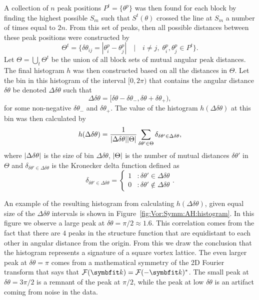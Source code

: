 A collection of $n$ peak positions $P^t = \{\theta^p\}$ was then found for each block by finding the highest possible $S_m$ such that $S^t(\theta)$ crossed the line at $S_m$ a number of times equal to $2n$. From this set of peaks,
then all possible distances between these peak positions were constructed by
\begin{equation}
    \label{eq:Vor:Symm:AH:mutualDistances}
    \Theta^t = \{\delta\theta_{ij} = |\theta^p_i-\theta^p_j|\quad|\quad i\neq j,\;\theta_i^p,\theta_j^p\in P^t\}.
\end{equation}
Let $\Theta = \bigcup_t\Theta^t$ be the union of all block sets of mutual angular peak distances. The final histogram $h$ was then constructed based on all the distances in $\Theta$. Let the bin
in this histogram of the interval $[0,2\pi)$ that contains the angular distance $\delta\theta$ be denoted $\Delta\delta\theta$ such that 
\begin{equation}
    \label{eq:Vor:Symm:AH:mutualDistancesBin}
    \Delta\delta\theta = [\delta\theta-\delta\theta_-,\delta\theta+\delta\theta_+),
\end{equation}
for some non-negative $\delta\theta_-$ and $\delta\theta_+$. The value of the histogram $h(\Delta\delta\theta)$ at this bin was then calculated by
\begin{equation}
    \label{eq:Vor:Symm:AH:histogramDef}
    h(\Delta\delta\theta) = \frac{1}{\lvert \Delta\delta\theta \rvert\lvert \Theta \rvert}\sum_{\delta\theta'\in\Theta}\delta_{\delta\theta'\in\Delta\delta\theta},
\end{equation}
where $\lvert \Delta\delta\theta \rvert$ is the size of bin $\Delta\delta\theta$, $\lvert \Theta \rvert$ is the number of mutual distances $\delta\theta'$ in $\Theta$
and $\delta_{\delta\theta'\in\Delta\delta\theta}$ is the Kronecker delta function defined as
\begin{equation}
    \label{eq:Vor:Symm:AH:kroneckerDelta}
    \delta_{\delta\theta'\in\Delta\delta\theta} = \left\{
    \begin{array}{lr}
        1 & : \delta\theta'\in\Delta\delta\theta \\
        0 & : \delta\theta'\notin\Delta\delta\theta
    \end{array}\right. .
\end{equation}

An example of the resulting histogram from calculating $h(\Delta\delta\theta)$, given equal size of the $\Delta\delta\theta$ intervals is shown in Figure~\ref{fig:Vor:Symm:AH:histogram}.
In this figure we observe a large peak at $\delta\theta = \pi/2 \approx 1.6$. This correlation comes from the fact that there are $4$ peaks in the structure function
that are equidistant to each other in angular distance from the origin. From this we draw the conclusion that the histogram represents a signature of a square vortex
lattice. The even larger peak at $\delta\theta = \pi$ comes from a mathematical symmetry of the 2D Fourier transform
that says that $\mathcal{F}(\v{k}) = \mathcal{F}(-\v{k})^\ast$. The small peak at $\delta\theta = 3\pi/2$ is a remnant of the peak at $\pi/2$, while the peak at low $\delta\theta$
is an artifact coming from noise in the data.

